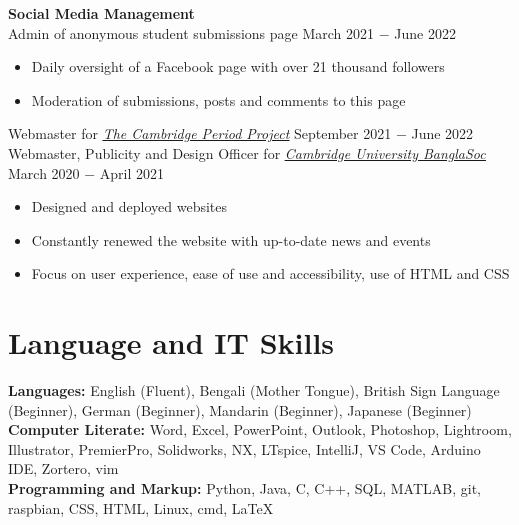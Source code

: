 \documentclass[8pt]{article}
\begin{document}
\textbf{Social Media Management}\\
Admin of anonymous student submissions page \hfill March 2021 $-$ June 2022
\begin{itemize}
    \item Daily oversight of a Facebook page with over 21 thousand followers
    \item Moderation of submissions, posts and comments to this page
\end{itemize}
Webmaster for \href{http://tcpp.soc.srcf.net/}{\underline{\textit{The Cambridge Period Project}}} \hfill September 2021 $-$ June 2022\\ 
Webmaster, Publicity and Design Officer for \href{https://cambridgebanglasoc.org/}{\underline{\textit{Cambridge University BanglaSoc}}} \hfill March 2020 $-$ April 2021
\begin{itemize}
    \item Designed and deployed websites
    \item Constantly renewed the website with up-to-date news and events 
    \item Focus on user experience, ease of use and accessibility, use of HTML and CSS
\end{itemize} \medskip

\vspace{-.75\baselineskip}
\hrulefill
\vspace{-.75\baselineskip}

\section*{Language and IT Skills}
\textbf{Languages:} English (Fluent), Bengali (Mother Tongue), 
British Sign Language (Beginner), 
German (Beginner), 
Mandarin (Beginner), 
Japanese (Beginner) \\
\textbf{Computer Literate:}
Word, Excel, PowerPoint, Outlook, Photoshop, Lightroom, Illustrator, PremierPro, 
Solidworks, NX, LTspice, IntelliJ, VS Code, Arduino IDE, Zortero, vim\\
\textbf{Programming and Markup:} Python, Java, C, C++, SQL, MATLAB, git, raspbian, CSS, HTML, Linux, cmd, \LaTeX\medskip

\vspace{-.75\baselineskip}
\hrulefill
\vspace{-.75\baselineskip}
\end{document}
